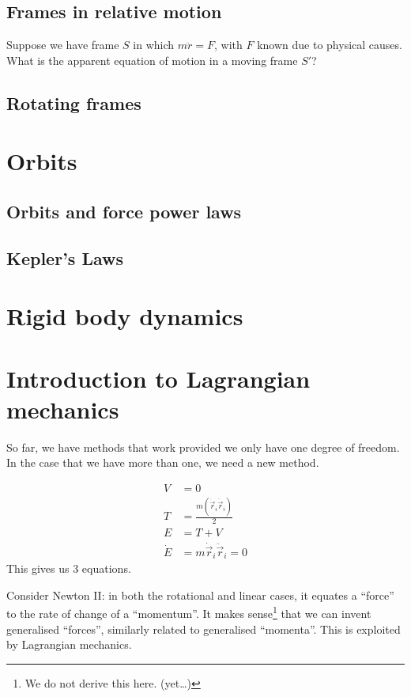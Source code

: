 \documentclass[a4paper]{article}
\begin{document}
\subsection{Frames in relative motion}
Suppose we have frame $S$ in which $m\ddot{r}=F$, with $F$ known due to physical causes. What is the apparent equation of motion in a moving frame $S'$?



\subsection{Rotating frames}




\section{Orbits}\label{sec:orbits}
\subsection{Orbits and force power laws}
\subsection{Kepler's Laws}
\section{Rigid body dynamics}\label{sec:rigid-body-dynamics}
\section{Introduction to Lagrangian mechanics}\label{sec:introduction-to-lagrangian-mechanics}
So far, we have methods that work provided we only have one degree of freedom. In the case that we have more than one, we need a new method.
\begin{eg}
  \begin{align*}
    V &= 0 \\
    T &= \frac{m (\dot{\vec{r}}_i \dot{\vec{r}}_i)}{2} \\
    E &= T + V \\
    \dot{E} &= m \dot{\vec{r}}_i \ddot{\vec{r}}_i = 0
  \end{align*}
  This gives us 3 equations.
\end{eg}

Consider Newton II: in both the rotational and linear cases, it equates a ``force'' to the rate of change of a ``momentum''. It makes sense\footnote{We do not derive this here. (yet\dots)} that we can invent generalised ``forces'', similarly related to generalised ``momenta''. This is exploited by Lagrangian mechanics.
\end{document}
